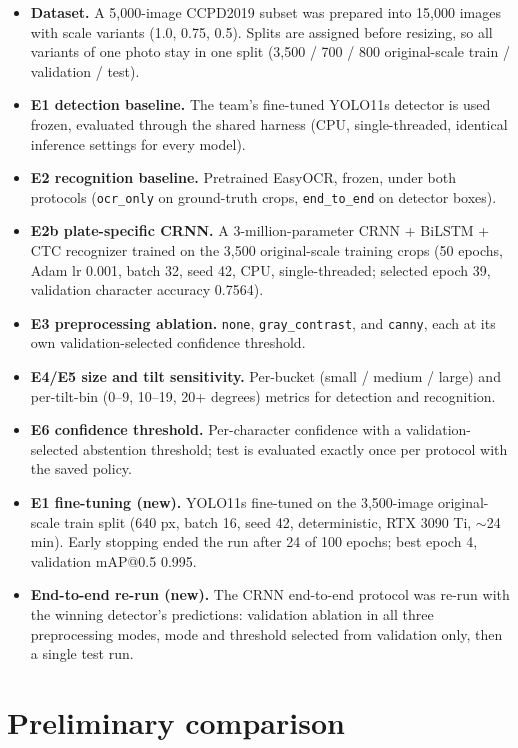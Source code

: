 \documentclass[11pt]{article}
\begin{document}
\begin{itemize}
\item \textbf{Dataset.} A 5{,}000-image CCPD2019 subset was prepared into
  15{,}000 images with scale variants (1.0, 0.75, 0.5). Splits are assigned
  before resizing, so all variants of one photo stay in one split
  (3{,}500 / 700 / 800 original-scale train / validation / test).
\item \textbf{E1 detection baseline.} The team's fine-tuned YOLO11s detector
  is used frozen, evaluated through the shared harness (CPU, single-threaded,
  identical inference settings for every model).
\item \textbf{E2 recognition baseline.} Pretrained EasyOCR, frozen, under
  both protocols (\texttt{ocr\_only} on ground-truth crops,
  \texttt{end\_to\_end} on detector boxes).
\item \textbf{E2b plate-specific CRNN.} A 3-million-parameter
  CRNN + BiLSTM + CTC recognizer trained on the 3{,}500 original-scale
  training crops (50 epochs, Adam lr 0.001, batch 32, seed 42, CPU,
  single-threaded; selected epoch 39, validation character accuracy 0.7564).
\item \textbf{E3 preprocessing ablation.} \texttt{none},
  \texttt{gray\_contrast}, and \texttt{canny}, each at its own
  validation-selected confidence threshold.
\item \textbf{E4/E5 size and tilt sensitivity.} Per-bucket (small / medium /
  large) and per-tilt-bin (0--9, 10--19, 20+ degrees) metrics for detection
  and recognition.
\item \textbf{E6 confidence threshold.} Per-character confidence with a
  validation-selected abstention threshold; test is evaluated exactly once
  per protocol with the saved policy.
\item \textbf{E1 fine-tuning (new).} YOLO11s fine-tuned on the
  3{,}500-image original-scale train split (640 px, batch 16, seed 42,
  deterministic, RTX 3090 Ti, $\sim$24 min). Early stopping ended the run
  after 24 of 100 epochs; best epoch 4, validation mAP@0.5 0.995.
\item \textbf{End-to-end re-run (new).} The CRNN end-to-end protocol was
  re-run with the winning detector's predictions: validation ablation in all
  three preprocessing modes, mode and threshold selected from validation
  only, then a single test run.
\end{itemize}

\section{Preliminary comparison}
\end{document}
